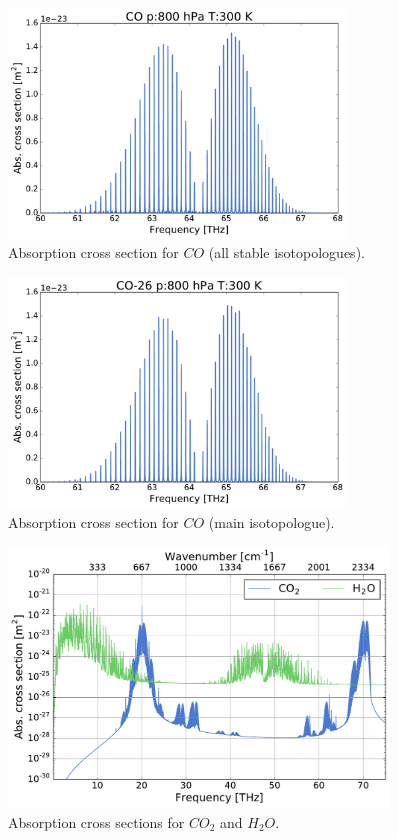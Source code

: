 \documentclass[paper=a4, fontsize=11pt]{scrartcl} %
\begin{document}
\clearpage
\begin{figure}[h!]
  \centering
  \includegraphics[width=0.8\textwidth]{plots/plot_xsec_CO_800hPa_300K.pdf}
  \caption{Absorption cross section for $CO$ (all stable isotopologues).}
  \label{fig:abs_xsec_CO}
\end{figure}
\vfill
\begin{figure}[h!]
  \centering
  \includegraphics[width=0.8\textwidth]{plots/plot_xsec_CO-26_800hPa_300K.pdf}
  \caption{Absorption cross section for $CO$ (main isotopologue).}
  \label{fig:abs_xsec_CO_main}
\end{figure}

\begin{figure}[ht]
  \includegraphics[angle=90, width=0.9\textwidth]{plots/abs_xsec_overview.pdf}
  \caption{Absorption cross sections for $CO_2$ and $H_2O$.}
  \label{fig:abs_xsec_overview}
\end{figure}
\end{document}
